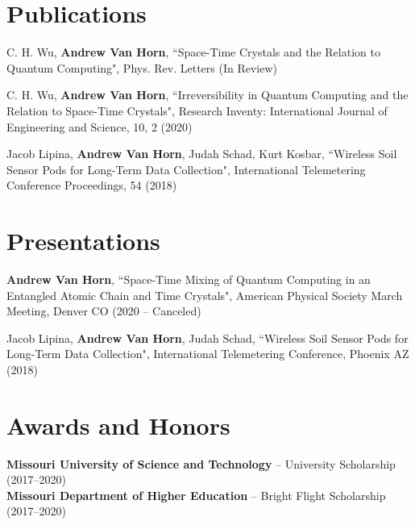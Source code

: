 \documentclass[letterpaper,11pt]{article}
\begin{document}
\section{Publications}
\begin{itemize}[leftmargin=0.15in, label={}]
	\small{\item{
			C. H. Wu, \textbf{Andrew Van Horn}, ``Space-Time Crystals and the Relation to Quantum Computing", Phys. Rev. Letters (In Review)
	}}
	\small{\item{
		C. H. Wu, \textbf{Andrew Van Horn}, ``Irreversibility in Quantum Computing and the Relation to Space-Time Crystals", Research Inventy: International Journal of Engineering and Science, 10, 2 (2020)
	}}
	\small{\item{
			Jacob Lipina, \textbf{Andrew Van Horn}, Judah Schad, Kurt Kosbar, ``Wireless Soil Sensor Pods for Long-Term Data Collection", International Telemetering Conference Proceedings, 54 (2018)
	}}
\end{itemize}	

\section{Presentations}
\begin{itemize}[leftmargin=0.15in, label={}]
	\small{\item{
			\textbf{Andrew Van Horn}, ``Space-Time Mixing of Quantum Computing in an Entangled Atomic Chain and Time Crystals", American Physical Society March Meeting, Denver CO (2020 -- Canceled)
	}}
	\small{\item{
			Jacob Lipina, \textbf{Andrew Van Horn}, Judah Schad, ``Wireless Soil Sensor Pods for Long-Term Data Collection", International Telemetering Conference, Phoenix AZ (2018)
	}}
\end{itemize}

\section{Awards and Honors}
\begin{itemize}[leftmargin=0.15in, label={}]
	\small{\item{\textbf{Missouri University of Science and Technology} -- University Scholarship (2017--2020)\\
	\textbf{Missouri Department of Higher Education} -- Bright Flight Scholarship (2017--2020)
}}
\end{itemize}
\end{document}
